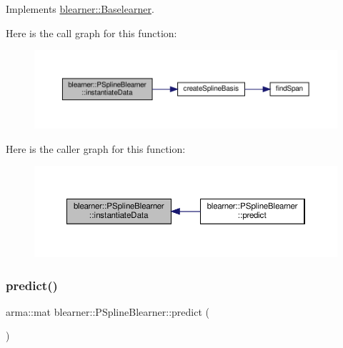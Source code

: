 Implements \mbox{\hyperlink{classblearner_1_1_baselearner_af01f1b8c4540927705ff79c3649489f7}{blearner\+::\+Baselearner}}.

Here is the call graph for this function\+:\nopagebreak
\begin{figure}[H]
\begin{center}
\leavevmode
\includegraphics[width=350pt]{classblearner_1_1_p_spline_blearner_ac0604daac451678e67a6a2ac60dd1b01_cgraph}
\end{center}
\end{figure}
Here is the caller graph for this function\+:\nopagebreak
\begin{figure}[H]
\begin{center}
\leavevmode
\includegraphics[width=350pt]{classblearner_1_1_p_spline_blearner_ac0604daac451678e67a6a2ac60dd1b01_icgraph}
\end{center}
\end{figure}
\mbox{\label{classblearner_1_1_p_spline_blearner_aa46e4474a352876fbfad64921254f6d5}} 
\subsubsection{\texorpdfstring{predict()}{predict()}\hspace{0.1cm}{\footnotesize\ttfamily [1/2]}}
{\footnotesize\ttfamily arma\+::mat blearner\+::\+P\+Spline\+Blearner\+::predict (\begin{DoxyParamCaption}{ }\end{DoxyParamCaption})\hspace{0.3cm}{\ttfamily [virtual]}}



